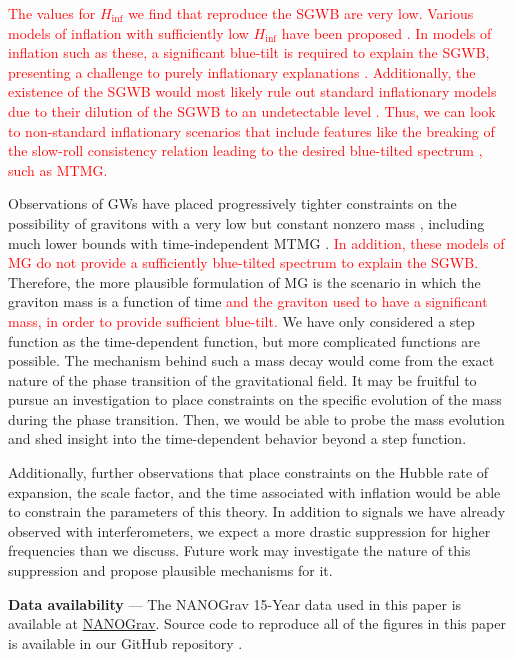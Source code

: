 \documentclass[prd,twocolumn,aps,psfig,nofootinbib,nobibnotes,superscriptaddress,preprintnumbers,times]{revtex4-2}
\def\red{\textcolor{red}}
\begin{document}
\red{The values for $H_{\inf}$ we find that reproduce the SGWB are very low. Various models of inflation with sufficiently low $H_{\inf}$ have been proposed \cite{Nakayama:2011ri, Takahashi:2018tdu, Drees:2021wgd}. In models of inflation such as these, a significant blue-tilt is required to explain the SGWB, presenting a challenge to purely inflationary explanations \cite{Vagnozzi:2023lwo}. Additionally, the existence of the SGWB would most likely rule out standard inflationary models due to their dilution of the SGWB to an undetectable level \cite{Vagnozzi:2022qmc}. Thus, we can look to non-standard inflationary scenarios that include features like the breaking of the slow-roll consistency relation leading to the desired blue-tilted spectrum \cite{EPTA:2023xxk}, such as MTMG.}

Observations of GWs have placed progressively tighter constraints on the possibility of gravitons with a very low but constant nonzero mass \cite{Bernardo:2023mxc, Wu:2023rib, Wang:2023div, deRham:2016nuf}, including much lower bounds with time-independent MTMG \cite{DeFelice:2021trp, DeFelice:2023bwq,}. \red{In addition, these models of MG do not provide a sufficiently blue-tilted spectrum to explain the SGWB.} Therefore, the more plausible formulation of MG is the scenario in which the graviton mass is a function of time \red{and the graviton used to have a significant mass, in order to provide sufficient blue-tilt.} We have only considered a step function as the time-dependent function, but more complicated functions are possible. The mechanism behind such a mass decay would come from the exact nature of the phase transition of the gravitational field. It may be fruitful to pursue an investigation to place constraints on the specific evolution of the mass during the phase transition. Then, we would be able to probe the mass evolution and shed insight into the time-dependent behavior beyond a step function.

Additionally, further observations that place constraints on the Hubble rate of expansion, the scale factor, and the time associated with inflation would be able to constrain the parameters of this theory. In addition to signals we have already observed with interferometers, we expect a more drastic suppression for higher frequencies than we discuss. Future work may investigate the nature of this suppression and propose plausible mechanisms for it.

\vspace{2mm}
{\bf Data availability} --- The NANOGrav 15-Year data used in this paper is available at \href{https://nanograv.org/science/data}{NANOGrav}. Source code to reproduce all of the figures in this paper is available in our GitHub repository \cite{GH}. 
\end{document}

